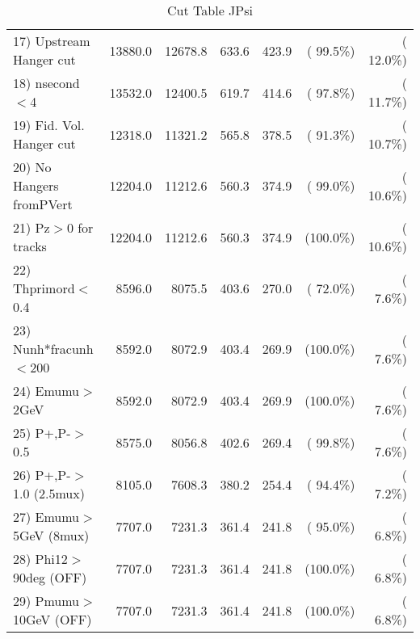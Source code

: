 \begin{table}[h!]
\begin{tabular}{||l||r|r|r|r|r|r||}
 17) Upstream Hanger cut  &      13880.0 &      12678.8 &        633.6 &        423.9 & ( 99.5\%) & ( 12.0\%) \\
 18) nsecond$<$4          &      13532.0 &      12400.5 &        619.7 &        414.6 & ( 97.8\%) & ( 11.7\%) \\
 19) Fid. Vol. Hanger cut &      12318.0 &      11321.2 &        565.8 &        378.5 & ( 91.3\%) & ( 10.7\%) \\
 20) No Hangers fromPVert &      12204.0 &      11212.6 &        560.3 &        374.9 & ( 99.0\%) & ( 10.6\%) \\
 21) Pz$>$0 for tracks    &      12204.0 &      11212.6 &        560.3 &        374.9 & (100.0\%) & ( 10.6\%) \\
 22) Thprimord$<$0.4      &       8596.0 &       8075.5 &        403.6 &        270.0 & ( 72.0\%) & (  7.6\%) \\
 23) Nunh*fracunh$<$200   &       8592.0 &       8072.9 &        403.4 &        269.9 & (100.0\%) & (  7.6\%) \\
 24) Emumu$>$2GeV         &       8592.0 &       8072.9 &        403.4 &        269.9 & (100.0\%) & (  7.6\%) \\
 25) P+,P-$>$0.5          &       8575.0 &       8056.8 &        402.6 &        269.4 & ( 99.8\%) & (  7.6\%) \\
 26) P+,P-$>$1.0 (2.5mux) &       8105.0 &       7608.3 &        380.2 &        254.4 & ( 94.4\%) & (  7.2\%) \\
 27) Emumu$>$5GeV  (8mux) &       7707.0 &       7231.3 &        361.4 &        241.8 & ( 95.0\%) & (  6.8\%) \\
 28) Phi12$>$90deg  (OFF) &       7707.0 &       7231.3 &        361.4 &        241.8 & (100.0\%) & (  6.8\%) \\
 29) Pmumu$>$10GeV  (OFF) &       7707.0 &       7231.3 &        361.4 &        241.8 & (100.0\%) & (  6.8\%) \\
 \hline
 \hline
 \end{tabular}
 \caption{Cut Table  JPsi     }
 \label{tab-cutcohjpsi-mumu_cohrhop}
 \end{table}
